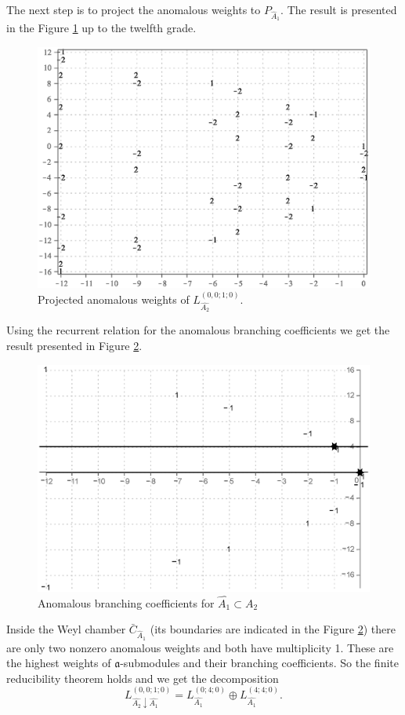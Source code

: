 \documentclass[12pt]{iopart}
\theoremstyle{definition}
\theoremstyle{definition}
\theoremstyle{definition}
\theoremstyle{definition}
\begin{document}
The next step is to project the anomalous weights to $P_{\hat A_1}$.
The result is presented in the Figure \ref{fig:AffineA2_A1_anom_proj} up to the twelfth grade.
\begin{figure}[h!tb]
  \centering
  \includegraphics[width=130mm]{figure8.eps}
  \caption{Projected anomalous weights of $L^{(0,0;1;0)}_{\hat{A_2}}$.}
  \label{fig:AffineA2_A1_anom_proj}
\end{figure}


Using the recurrent relation for the anomalous branching coefficients
we get the result presented in Figure \ref{fig:AffineA2_A1_branching}.
\begin{figure}[h!tb]
  \centering
  \includegraphics[width=130mm]{figure9.eps}
  \caption{Anomalous branching coefficients for $\hat{A_1}\subset \hat{A_2}$}
  \label{fig:AffineA2_A1_branching}
\end{figure}
Inside the Weyl chamber $\bar{C}_{\hat{A}_1}$
(its boundaries are indicated in the Figure \ref{fig:AffineA2_A1_branching})
there are only two nonzero anomalous weights and both have multiplicity 1.
These are the highest weights of $\mathfrak{a}$-submodules and their branching
coefficients. So the finite reducibility theorem holds and we get the decomposition
\begin{equation*}
  \label{eq:43}
  L^{(0,0;1;0)}_{\hat{A_2}\downarrow \hat{A_1}}= L_{\hat{A_1}}^{(0;4;0)}\oplus L_{\hat{A_1}}^{(4;4;0)}.
\end{equation*}
\end{document}
